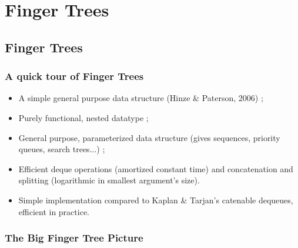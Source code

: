 
\section{Finger Trees}

\subsection*{Finger Trees}
\begin{frame}
  \frametitle{A quick tour of Finger Trees}
  
  \begin{itemize}
  \item A simple general purpose data structure (Hinze \& Paterson, 2006) ;
  \item Purely functional, nested datatype ;
  \item General purpose, parameterized data structure (gives sequences,
    priority queues, search trees...) ;
  \item Efficient deque operations (amortized constant time) and
    concatenation and splitting (logarithmic in smallest argument's
    size).
  \item Simple implementation compared to Kaplan \& Tarjan's
    catenable dequeues, efficient in practice.
  \end{itemize}
  
\end{frame}

\begin{frame}
  \frametitle{The Big Finger Tree Picture}
\end{frame}


